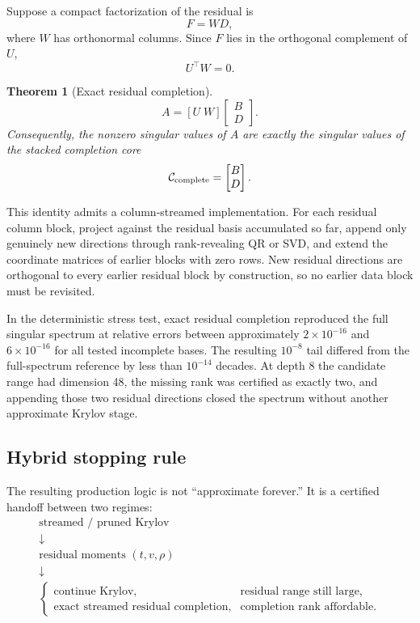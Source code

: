\documentclass[11pt]{article}
\newtheorem{theorem}{Theorem}[section]
\theoremstyle{definition}
\theoremstyle{remark}
\begin{document}
Suppose a compact factorization of the residual is
\[
F=WD,
\]
where \(W\) has orthonormal columns.  Since \(F\) lies in the orthogonal
complement of \(U\),
\[
U^\top W=0.
\]

\begin{theorem}[Exact residual completion]
\[
\boxed{
A
=
[U\;W]
\begin{bmatrix}
B\\D
\end{bmatrix}.
}
\]
Consequently, the nonzero singular values of \(A\) are exactly the singular
values of the stacked completion core
\[
\mathcal C_{\rm complete}
=
\begin{bmatrix}
B\\D
\end{bmatrix}.
\]
\end{theorem}

This identity admits a column-streamed implementation.  For each residual
column block, project against the residual basis accumulated so far, append
only genuinely new directions through rank-revealing QR or SVD, and extend the
coordinate matrices of earlier blocks with zero rows.  New residual directions
are orthogonal to every earlier residual block by construction, so no earlier
data block must be revisited.

In the deterministic stress test, exact residual completion reproduced the
full singular spectrum at relative errors between approximately
\(2\times10^{-16}\) and \(6\times10^{-16}\) for all tested incomplete bases.
The resulting \(10^{-8}\) tail differed from the full-spectrum reference by
less than \(10^{-14}\) decades.  At depth 8 the candidate range had dimension
48, the missing rank was certified as exactly two, and appending those two
residual directions closed the spectrum without another approximate Krylov
stage.

\subsection{Hybrid stopping rule}

The resulting production logic is not ``approximate forever.''  It is a
certified handoff between two regimes:
\[
\boxed{
\begin{array}{c}
\text{streamed / pruned Krylov}\\[2mm]
\downarrow\\[-1mm]
\text{residual moments }(t,v,\rho)\\[2mm]
\downarrow\\[-1mm]
\begin{cases}
\text{continue Krylov}, & \text{residual range still large},\\
\text{exact streamed residual completion}, & \text{completion rank affordable}.
\end{cases}
\end{array}
}
\]
\end{document}
